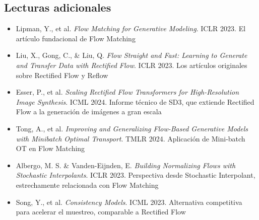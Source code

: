 \subsection{Lecturas adicionales}

\begin{itemize}
    \item Lipman, Y., et al. \textit{Flow Matching for Generative Modeling}. ICLR 2023. {\small El artículo fundacional de Flow Matching}
    \item Liu, X., Gong, C., \& Liu, Q. \textit{Flow Straight and Fast: Learning to Generate and Transfer Data with Rectified Flow}. ICLR 2023. {\small Los artículos originales sobre Rectified Flow y Reflow}
    \item Esser, P., et al. \textit{Scaling Rectified Flow Transformers for High-Resolution Image Synthesis}. ICML 2024. {\small Informe técnico de SD3, que extiende Rectified Flow a la generación de imágenes a gran escala}
    \item Tong, A., et al. \textit{Improving and Generalizing Flow-Based Generative Models with Minibatch Optimal Transport}. TMLR 2024. {\small Aplicación de Mini-batch OT en Flow Matching}
    \item Albergo, M. S. \& Vanden-Eijnden, E. \textit{Building Normalizing Flows with Stochastic Interpolants}. ICLR 2023. {\small Perspectiva desde Stochastic Interpolant, estrechamente relacionada con Flow Matching}
    \item Song, Y., et al. \textit{Consistency Models}. ICML 2023. {\small Alternativa competitiva para acelerar el muestreo, comparable a Rectified Flow}
\end{itemize}




